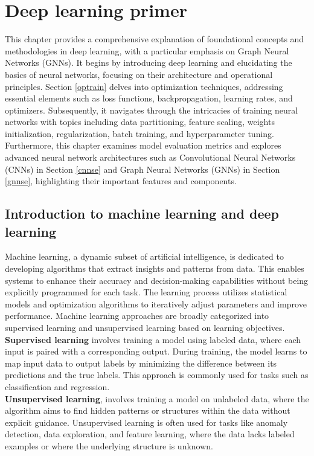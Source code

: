 \chapter{Deep learning primer}
\label{chap:Theory-Deep Learning}
This chapter provides a comprehensive explanation of foundational concepts and methodologies in deep learning, with a particular emphasis on Graph Neural Networks (GNNs). It begins by introducing deep learning and elucidating the basics of neural networks, focusing on their architecture and operational principles. Section \ref{optrain} delves into optimization techniques, addressing essential elements such as loss functions, backpropagation, learning rates, and optimizers. Subsequently, it navigates through the intricacies of training neural networks with topics including data partitioning, feature scaling, weights initialization, regularization, batch training, and hyperparameter tuning. Furthermore, this chapter examines model evaluation metrics and explores advanced neural network architectures such as Convolutional Neural Networks (CNNs) in Section \ref{cnnse} and Graph Neural Networks (GNNs) in Section \ref{gnnse}, highlighting their important features and components. 

\section{Introduction to machine learning and deep learning}
Machine learning, a dynamic subset of artificial intelligence, is dedicated to developing algorithms that extract insights and patterns from data. This enables systems to enhance their accuracy and decision-making capabilities without being explicitly programmed for each task. The learning process utilizes statistical models and optimization algorithms to iteratively adjust parameters and improve performance. Machine learning approaches are broadly categorized into supervised learning and unsupervised learning based on learning objectives. \\

\textbf{Supervised learning} involves training a model using labeled data, where each input is paired with a corresponding output. During training, the model learns to map input data to output labels by minimizing the difference between its predictions and the true labels. This approach is commonly used for tasks such as classification and regression. \\

\textbf{Unsupervised learning}, involves training a model on unlabeled data, where the algorithm aims to find hidden patterns or structures within the data without explicit guidance. Unsupervised learning is often used for tasks like anomaly detection, data exploration, and feature learning, where the data lacks labeled examples or where the underlying structure is unknown. \\

